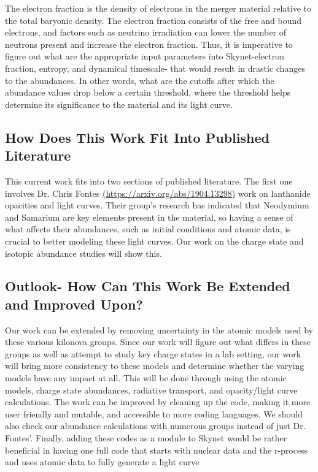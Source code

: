 \documentclass[11pt,a4paper]{article}
\begin{document}
The electron fraction is the density of electrons in the merger material relative to the total baryonic density. The electron fraction consists of the free and bound electrons, and factors such as neutrino irradiation can lower the number of neutrons present and increase the electron fraction. Thus, it is imperative to figure out what are the appropriate input parameters into Skynet-electron fraction, entropy, and dynamical timescale- that would result in drastic changes to the abundances. In other words, what are the cutoffs after which the abundance values drop below a certain threshold, where the threshold helps determine its significance to the material and its light curve. 

\subsection{How Does This Work Fit Into Published Literature}

This current work fits into two sections of published literature. The first one involves Dr. Chris Fontes \url{(https://arxiv.org/abs/1904.13298)} work on lanthanide opacities and light curves. Their group’s research has indicated that Neodymium and Samarium are key elements present in the material, so having a sense of what affects their abundances, such as initial conditions and atomic data, is crucial to better modeling these light curves. Our work on the charge state and isotopic abundance studies will show this.

\subsection{Outlook- How Can This Work Be Extended and Improved Upon?}

Our work can be extended by removing uncertainty in the atomic models used by these various kilonova groups. Since our work will figure out what differs in these groups as well as attempt to study key charge states in a lab setting, our work will bring more consistency to these models and determine whether the varying models have any impact at all. This will be done through using the atomic models, charge state abundances, radiative transport, and opacity/light curve calculations. 
The work can be improved by cleaning up the code, making it more user friendly and mutable, and accessible to more coding languages. We should also check our abundance calculations with numerous groups instead of just Dr. Fontes’. Finally, adding these codes as a module to Skynet would be rather beneficial in having one full code that starts with nuclear data and the r-process and uses atomic data to fully generate a light curve



\end{document}
